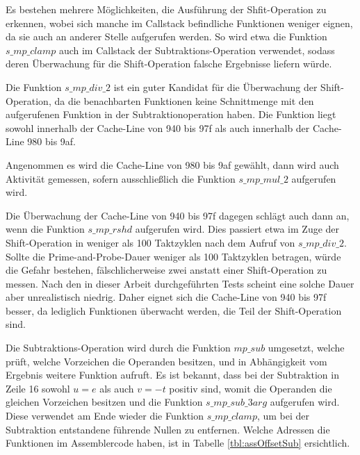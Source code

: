 Es bestehen mehrere Möglichkeiten, die Ausführung der Shfit-Operation zu erkennen, wobei sich manche im Callstack befindliche Funktionen weniger eignen, da sie auch an anderer Stelle aufgerufen werden.
So wird etwa die Funktion $s\_mp\_clamp$ auch im Callstack der Subtraktions-Operation verwendet, sodass deren Überwachung für die Shift-Operation falsche Ergebnisse liefern würde.

Die Funktion $s\_mp\_div\_2$ ist ein guter Kandidat für die Überwachung der Shift-Operation, da die benachbarten Funktionen keine Schnittmenge mit den aufgerufenen Funktion in der Subtraktionoperation haben.
Die Funktion liegt sowohl innerhalb der Cache-Line von 940 bis 97f als auch innerhalb der Cache-Line 980 bis 9af.

Angenommen es wird die Cache-Line von 980 bis 9af gewählt, dann wird auch Aktivität gemessen, sofern ausschließlich die Funktion $s\_mp\_mul\_2$ aufgerufen wird.

Die Überwachung der Cache-Line von 940 bis 97f dagegen schlägt auch dann an, wenn die Funktion $s\_mp\_rshd$ aufgerufen wird.
Dies passiert etwa im Zuge der Shift-Operation in weniger als 100 Taktzyklen nach dem Aufruf von $s\_mp\_div\_2$.
Sollte die Prime-and-Probe-Dauer weniger als 100 Taktzyklen betragen, würde die Gefahr bestehen, fälschlicherweise zwei anstatt einer Shift-Operation zu messen.
Nach den in dieser Arbeit durchgeführten Tests scheint eine solche Dauer aber unrealistisch niedrig.
Daher eignet sich die Cache-Line von 940 bis 97f besser, da lediglich Funktionen überwacht werden, die Teil der Shift-Operation sind.


Die Subtraktions-Operation wird durch die Funktion $mp\_sub$ umgesetzt, welche prüft, welche Vorzeichen die Operanden besitzen, und in Abhängigkeit vom Ergebnis weitere Funktion aufruft.
Es ist bekannt, dass bei der Subtraktion in Zeile 16 sowohl $u=e$ als auch $v=-t$ positiv sind, womit die Operanden die gleichen Vorzeichen besitzen und die Funktion $s\_mp\_sub\_3arg$ aufgerufen wird.
Diese verwendet am Ende wieder die Funktion $s\_mp\_clamp$, um bei der Subtraktion entstandene führende Nullen zu entfernen.
Welche Adressen die Funktionen im Assemblercode haben, ist in Tabelle \ref{tbl:assOffsetSub} ersichtlich. 


